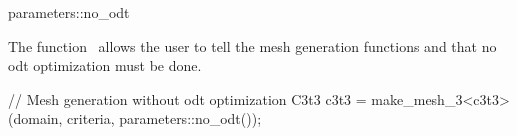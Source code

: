 \ccRefPageBegin


\begin{ccRefFunction}{parameters::no_odt}  %


\ccDefinition
  
The function \ccRefName\ allows the user to tell the mesh generation functions
 and  that no odt optimization must be done.





\ccExample

\begin{ccExampleCode}
// Mesh generation without odt optimization
C3t3 c3t3 = make_mesh_3<c3t3>(domain, criteria, parameters::no_odt());
\end{ccExampleCode}

\ccSeeAlso

 \\
 \\
 \\


\end{ccRefFunction}

\ccRefPageEnd


